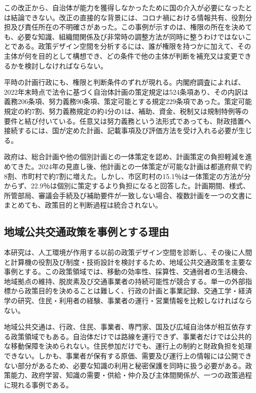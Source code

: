 この改正から、自治体が能力を獲得しなかったために国の介入が必要になったとは結論できない。改正の直接的な背景には、コロナ禍における情報共有、役割分担及び責任所在の不明確さがあった\cite{chihoseido33,sangiin2024localgov}。この事例が示すのは、権限の所在を決めても、必要な知識、組織間関係及び非常時の調整方法が同時に整うわけではないことである。政策デザイン空間を分析するには、誰が権限を持つかに加えて、その主体が何を目的として構想でき、どの条件で他の主体が判断を補充又は変更できるかを検討しなければならない。

平時の計画行政にも、権限と判断条件のずれが現れる。内閣府調査によれば、2022年末時点で法令に基づく自治体計画の策定規定は524条項あり、その内訳は義務206条項、努力義務90条項、策定可能とする規定229条項であった。策定可能規定の約7割、努力義務規定の約4分の1は、補助、資金、税制又は規制特例等の要件と結び付いている\cite{cao2023localplans}。任意又は努力義務という法形式であっても、財政措置へ接続するには、国が定めた計画、記載事項及び評価方法を受け入れる必要が生じる。

政府は、総合計画や他の個別計画との一体策定を認め、計画策定の負担軽減を進めてきた。2024年の見直し後、他計画との一体策定が可能な計画は都道府県で約8割、市町村で約7割に増えた\cite{cao2023localplans,cao2024integratedplans}。しかし、市区町村の15.1％は一体策定の方法が分からず、22.9％は個別に策定するより負担になると回答した\cite{cao2024municipalplans}。計画期間、様式、所管部局、審議会手続及び補助要件が一致しない場合、複数計画を一つの文書にまとめても、政策目的と判断過程は統合されない。

\subsection{地域公共交通政策を事例とする理由}
\label{subsec:intro_case_fit}

本研究は、人工環境が作用する以前の政策デザイン空間を診断し、その後に人間と計算機の役割及び制度・技術設計を検討するため、地域公共交通政策を主要な事例とする。この政策領域では、移動の効率性、採算性、交通弱者の生活機会、地域拠点の維持、脱炭素及び交通事業者の持続可能性が競合する。単一の外部指標から政策目的を決めることは難しく、行政の計画と事業記録、交通工学・経済学の研究、住民・利用者の経験、事業者の運行・営業情報を比較しなければならない。

地域公共交通は、行政、住民、事業者、専門家、国及び広域自治体が相互依存する政策領域でもある。自治体だけでは路線を運行できず、事業者だけでは公共的な移動保障を決められない。住民参加だけでも、運行上の制約と財政負担を処理できない。しかも、事業者が保有する原価、需要及び運行上の情報には公開できない部分があるため、必要な知識の利用と秘密保護を同時に扱う必要がある。政策能力、政府学習、知識の需要・供給・仲介及び主体間関係が、一つの政策過程に現れる事例である。

